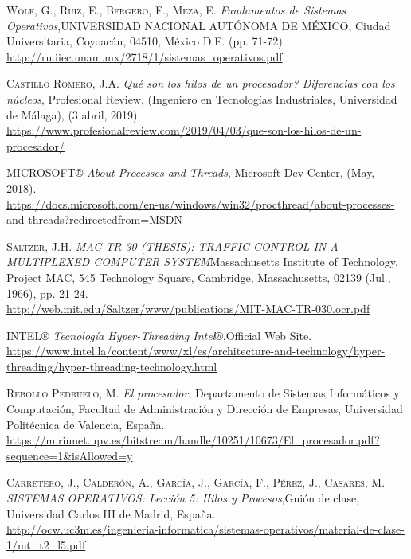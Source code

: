 \documentclass[12pt]{article}
\begin{document}
\begin{thebibliography}{x}

 \textsc{Wolf, G., Ruiz, E., Bergero, F., Meza, E.}
\textit{Fundamentos de Sistemas Operativos},UNIVERSIDAD NACIONAL AUTÓNOMA DE MÉXICO, Ciudad Universitaria, Coyoacán, 04510, México D.F.
(pp. 71-72). \\\url{http://ru.iiec.unam.mx/2718/1/sistemas_operativos.pdf}

 \textsc{Castillo Romero, J.A.}
\textit{Qué son los hilos de un procesador? Diferencias con los núcleos}, Profesional Review, (Ingeniero en Tecnologías Industriales, Universidad de Málaga), (3 abril, 2019). \\\url{https://www.profesionalreview.com/2019/04/03/que-son-los-hilos-de-un-procesador/}

 \textsc{MICROSOFT®}
\textit{About Processes and Threads}, Microsoft Dev Center, (May, 2018). \\\url{https://docs.microsoft.com/en-us/windows/win32/procthread/about-processes-and-threads?redirectedfrom=MSDN}

 \textsc{Saltzer, J.H.}
\textit{MAC-TR-30 (THESIS): TRAFFIC CONTROL IN A MULTIPLEXED COMPUTER SYSTEM}Massachusetts Institute of Technology, Project MAC, 545 Technology Square, Cambridge, Massachusetts, 02139 (Jul., 1966), pp. 21-24. \\\url{http://web.mit.edu/Saltzer/www/publications/MIT-MAC-TR-030.ocr.pdf}

 \textsc{INTEL®}
\textit{Tecnología Hyper-Threading Intel®},Official Web Site.\\\url{https://www.intel.la/content/www/xl/es/architecture-and-technology/hyper-threading/hyper-threading-technology.html}

 \textsc{Rebollo Pedruelo, M.}
\textit{El procesador}, Departamento de Sistemas Informáticos y Computación, Facultad de Administración y Dirección de Empresas, Universidad Politécnica de Valencia, España. \\\url{https://m.riunet.upv.es/bitstream/handle/10251/10673/El_procesador.pdf?sequence=1&isAllowed=y}

 \textsc{Carretero, J., Calderón, A., García, J., García, F., Pérez, J., Casares, M.}
\textit{SISTEMAS OPERATIVOS: Lección 5: Hilos y Procesos},Guión de clase, Universidad Carlos III de Madrid, España.  \\\url{http://ocw.uc3m.es/ingenieria-informatica/sistemas-operativos/material-de-clase-1/mt_t2_l5.pdf}


\end{thebibliography}
\end{document}
